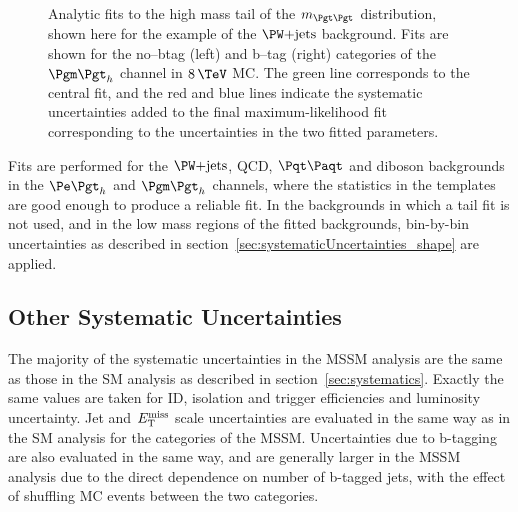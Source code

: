 \begin{figure}[tbh]
\caption[Analytic fits to the high mass tail of the $m_{\Pgt\Pgt}$ distribution,
shown for the example of the $\WJets$ background.]{Analytic fits to the high mass tail of the $m_{\Pgt\Pgt}$ distribution,
shown here for the example of the $\WJets$ background. Fits are shown for the
no--btag (left) and b--tag (right) categories of the $\mutau$ channel in $8\,\TeV$
\ac{MC}. The green line corresponds to the central fit, and the red and blue
lines indicate the systematic uncertainties added to the final
maximum-likelihood fit corresponding to the uncertainties in the two fitted
parameters.}
\label{fig:tailfits}
\end{figure}

Fits are performed for the $\WJets$, QCD, $\ttbar$ and diboson backgrounds in the $\etau$
and $\mutau$ channels, where the statistics in the templates are good enough to
produce a reliable fit. In the backgrounds in which a tail fit is not used, and
in the low mass regions of the fitted backgrounds, bin-by-bin uncertainties as
described in section~\ref{sec:systematicUncertainties_shape} are applied.

\subsection{Other Systematic Uncertainties}
The majority of the systematic uncertainties in the \ac{MSSM} analysis are the
same as those in the \ac{SM} analysis as described in
section~\ref{sec:systematics}. Exactly the same values are taken for ID, isolation and
trigger efficiencies and luminosity uncertainty. Jet and $E_{\mathrm{T}}^{\text{miss}}$ scale
uncertainties are evaluated in the same way as in the \ac{SM} analysis 
for the categories of the \ac{MSSM}. 
Uncertainties due to b-tagging are also evaluated in the same way, 
and are generally larger in the \ac{MSSM} analysis due to
the direct dependence on number of b-tagged jets, with the effect of shuffling 
\ac{MC} events between the two categories.   

